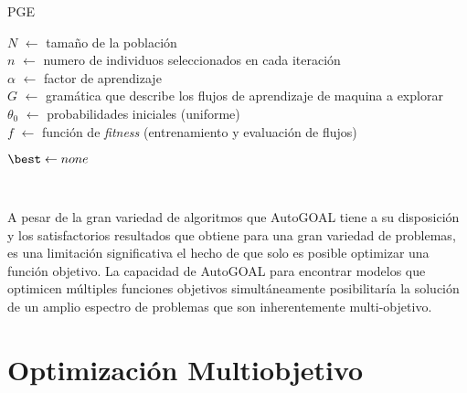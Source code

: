 \begin{algorithm}[htb!]
    \caption{PGE\label{algorithm:pge}}

    $N$ $\leftarrow$ tamaño de la población \\
    $n$ $\leftarrow$ numero de individuos seleccionados en cada iteración \\
    $\alpha$ $\leftarrow$ factor de aprendizaje \\
    $G$ $\leftarrow$ gramática que describe los flujos de aprendizaje de maquina a explorar \\
    $\theta_0$ $\leftarrow$ probabilidades iniciales (uniforme) \\
    $f$ $\leftarrow$ función de \emph{fitness} (entrenamiento y evaluación de flujos) \\


    $\best \leftarrow none$

    \Return{\best} \\
\end{algorithm}

A pesar de la gran variedad de algoritmos que AutoGOAL tiene a su disposición y los satisfactorios resultados que obtiene para una gran variedad de problemas, es una limitación significativa el hecho de que solo es posible optimizar una función objetivo.
La capacidad de AutoGOAL para encontrar modelos que optimicen múltiples funciones objetivos simultáneamente posibilitaría la solución de un amplio espectro de problemas que son inherentemente multi-objetivo.


\section{Optimización Multiobjetivo}\label{section:multiobjective}

